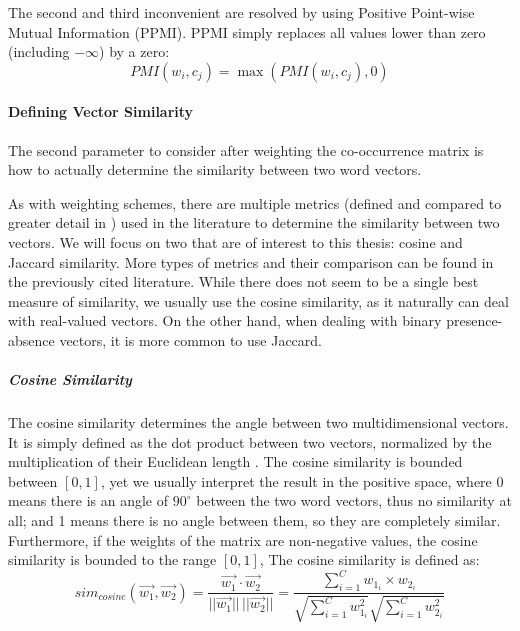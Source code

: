 The second and third inconvenient are resolved by using Positive Point-wise Mutual Information (PPMI). PPMI simply replaces all values lower than zero (including $-\infty$) by a zero:
\begin{equation} \label{eq:ppmi}
PMI(w_i,c_j) = \max(PMI(w_i,c_j), 0)
\end{equation}
\paragraph{Defining Vector Similarity}
The second parameter to consider after weighting the co-occurrence matrix is how to actually determine the similarity between two word vectors.

As with weighting schemes, there are multiple metrics (defined and compared to greater detail in \cite{ClarkBook2010,ferret2010testing,kiela2014systematic,clark2015vector}) used in the literature to determine the similarity between two vectors. We will focus on two that are of interest to this thesis: cosine and Jaccard similarity. More types of metrics and their comparison can be found in the previously cited literature. While there does not seem to be a single best measure of similarity, we usually use the cosine similarity, as it naturally can deal with real-valued vectors. On the other hand, when dealing with binary presence-absence vectors, it is more common to use Jaccard. 

\subparagraph{Cosine Similarity}
The cosine similarity determines the angle between two multidimensional vectors. It is simply defined as the dot product between two vectors, normalized by the multiplication of their Euclidean length \cite{Manning2008}. The cosine similarity is bounded between $[0,1]$, yet we usually interpret the result in the positive space, where 0 means there is an angle of $90^\circ$ between the two word vectors, thus  no similarity at all; and 1 means there is no angle between them, so they are completely similar. Furthermore, if the weights of the matrix are non-negative values, the cosine similarity is bounded to the range $[0,1]$, The cosine similarity is defined as:
\begin{equation}
sim_{cosine}(\overrightarrow{w_1},\overrightarrow{w_2})  =  \dfrac{\overrightarrow{w_1}  \cdot \overrightarrow{w_2}}{||\overrightarrow{w_1}||\,||\overrightarrow{w_2}||} = \dfrac{\sum_{i=1}^Cw_{1_i}\times w_{2_i} }{\sqrt{\sum^C_{i=1}w_{1_i}^2}\sqrt{\sum^C_{i=1}w_{2_i}^2}}
\end{equation}

